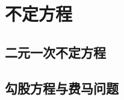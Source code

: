 
\section{不定方程}
\label{sec:indefinite-equation}

\subsection{二元一次不定方程}
\label{sec:indefinite-binary-equation-of-the-first-degree}

\subsection{勾股方程与费马问题}
\label{sec:pythagorean-equation-and-fermat-problem}


